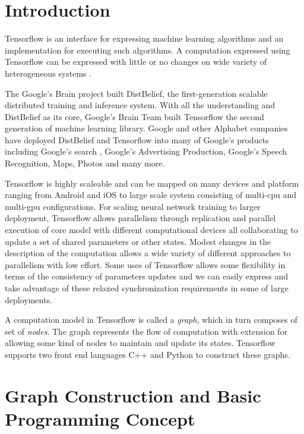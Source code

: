 \documentclass[12pt, a4paper]{report}
\begin{document}
\section{Introduction}\label{sec:tensor_intro}
\justify
Tensorflow is an interface for expressing machine learning algorithms and an implementation for executing such algorithms. A computation expressed using Tensorflow can be expressed with little or no changes on wide variety of heterogeneous systems \cite{tensorflow_paper}. \\ \par
\justify
The Google's Brain project built DistBelief, the first-generation scalable distributed training and inference system. With all the understanding and DistBelief as its core, Google's Brain Team built Tensorflow the second generation of machine learning library. Google and other Alphabet companies have deployed DistBelief and Tensorflow into many of Google's products including Google's search \cite{googleSearch}, Google's Advertising Production, Google's Speech Recognition, Maps, Photos and many more. \\ \par
\justify
Tensorflow is highly scaleable and can be mapped on many devices and platform ranging from Android and iOS to large scale system consisting of multi-cpu and multi-gpu configurations. For scaling neural network training to larger deployment, Tensorflow allows parallelism through replication and parallel execution of core model with different computational devices all collaborating to update a set of shared parameters or other states. Modest changes in the description of the computation allows a wide variety of different approaches to parallelism with low effort. Some uses of Tensorflow allows some flexibility in terms of the consistency of parameters updates and we can easily express and take advantage of these relaxed synchronization requirements in some of large deployments.\\ \par

A computation model in Tensorflow is called a \textit{graph}, which in turn composes of set of \textit{nodes}. The graph represents the flow of computation with extension for allowing some kind of nodes to maintain and update its states. Tensorflow supports two front end languages C++ and Python to construct these graphs.\\ \par
\clearpage

\section{Graph Construction and Basic Programming Concept}\label{sec:programmingtensorflow}
\end{document}
